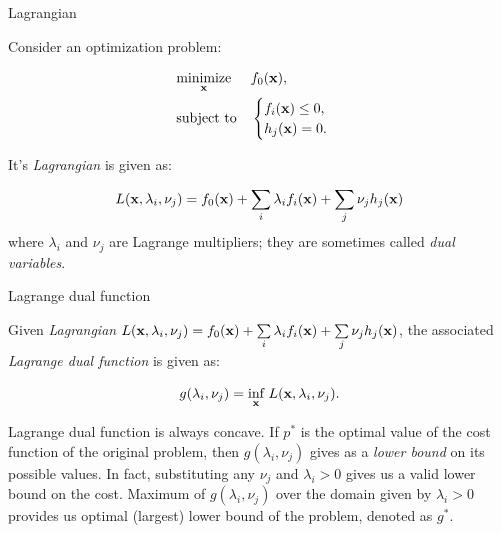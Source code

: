 \documentclass{beamer}
\begin{document}
\begin{frame}{Lagrangian}
	\begin{flushleft}
		
		Consider an optimization problem:
		
		\begin{equation}
			\begin{aligned}
				& \underset{\mathbf{x}}{\text{minimize}}
				& & f_0(\mathbf{x}), \\
				& \text{subject to}
				& & \begin{cases}
					f_i(\mathbf{x}) \leq 0, \\
					h_j(\mathbf{x}) = 0.
				\end{cases}
			\end{aligned}
		\end{equation}
		
		It's \emph{Lagrangian} is given as:
		
		\begin{equation}
			L(\mathbf{x}, \lambda_i, \nu_j) = 
			f_0(\mathbf{x}) + 
			\sum\limits_i \lambda_i f_i(\mathbf{x}) +
			\sum\limits_j \nu_j h_j(\mathbf{x})
		\end{equation}
	where $\lambda_i$ and $\nu_j$ are Lagrange multipliers; they are sometimes called \emph{dual variables}.
		
	\end{flushleft}
\end{frame}



\begin{frame}{Lagrange dual function}
	\begin{flushleft}
		
	Given \emph{Lagrangian} $L(\mathbf{x}, \lambda_i, \nu_j) = 
	f_0(\mathbf{x}) + 
	\sum\limits_i \lambda_i f_i(\mathbf{x}) +
	\sum\limits_j \nu_j h_j(\mathbf{x})$, the associated 
	 \emph{Lagrange dual function} is given as:
		
		\begin{equation}
			g(\lambda_i, \nu_j)  = \underset{\mathbf{x}}{\text{inf}}
			\ L(\mathbf{x}, \lambda_i, \nu_j).
		\end{equation}
		
		Lagrange dual function is always concave. If $p^*$ is the optimal value of the cost function of the original problem, then $g(\lambda_i, \nu_j)$ gives as a \emph{lower bound} on its possible values. In fact, substituting any $\nu_j$ and $\lambda_i > 0$ gives us a valid lower bound on the cost. Maximum of $g(\lambda_i, \nu_j)$ over the domain given by $\lambda_i > 0$ provides us optimal (largest) lower bound of the problem, denoted as $g^*$. 
		
	\end{flushleft}
\end{frame}
\end{document}
